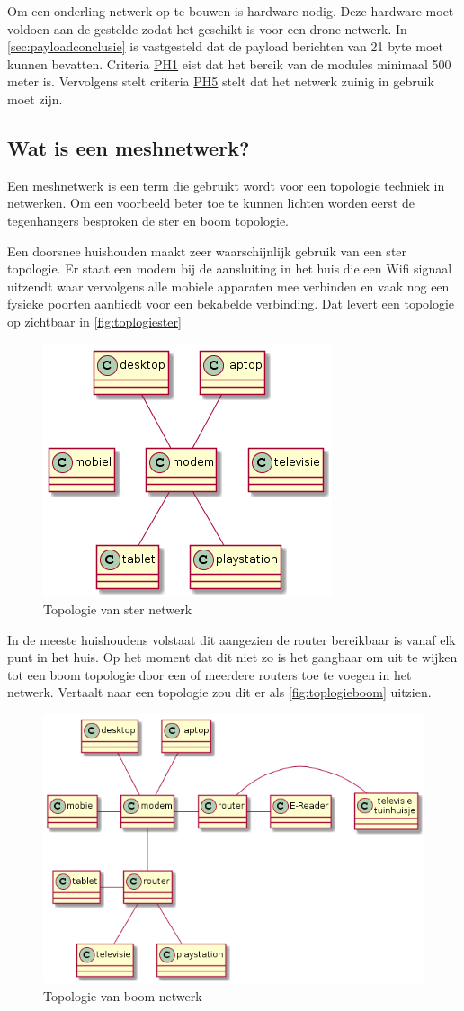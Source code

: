 \documentclass[a4paper, 11pt, oneside]{report}
\begin{document}
Om een onderling netwerk op te bouwen is hardware nodig. 
Deze hardware moet voldoen aan de gestelde  zodat het geschikt is voor een drone netwerk.
In \autoref{sec:payloadconclusie} is vastgesteld dat de payload berichten van 21 byte moet kunnen bevatten.
Criteria \hyperlink{ph1}{PH1} eist dat het bereik van de modules minimaal 500 meter is.
Vervolgens stelt criteria \hyperlink{ph5}{PH5} stelt dat het netwerk zuinig in gebruik moet zijn. 
\subsection{Wat is een meshnetwerk?}
Een meshnetwerk is een term die gebruikt wordt voor een topologie techniek in netwerken.
Om een voorbeeld beter toe te kunnen lichten worden eerst de tegenhangers besproken de ster en boom topologie.

Een doorsnee huishouden maakt zeer waarschijnlijk gebruik van een ster topologie.
Er staat een modem bij de aansluiting in het huis die een Wifi signaal uitzendt waar vervolgens alle mobiele apparaten mee verbinden en vaak nog een fysieke poorten aanbiedt voor een bekabelde verbinding.
Dat levert een topologie op zichtbaar in \autoref{fig:toplogiester}

\begin{figure}[H]
	\begin{center}\includegraphics[width=.4\linewidth]{sterTopo}\end{center}
	\caption{Topologie van ster netwerk}
	\label{fig:toplogiester}
\end{figure}

In de meeste huishoudens volstaat dit aangezien de router bereikbaar is vanaf elk punt in het huis.
Op het moment dat dit niet zo is het gangbaar om uit te wijken tot een boom topologie door een of meerdere routers toe te voegen in het netwerk.
Vertaalt naar een topologie zou dit er als \autoref{fig:toplogieboom} uitzien.

\begin{figure}[H]
	\begin{center}\includegraphics[width=.5\linewidth]{treeTopo}\end{center}
	\caption{Topologie van boom netwerk}
	\label{fig:toplogieboom}
\end{figure}
\end{document}
